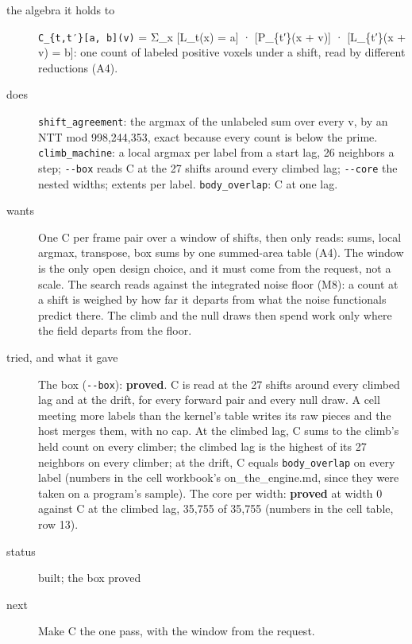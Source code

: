 \begin{description}
\item[{the algebra it holds to}] \texttt{C\_\allowbreak{}\{t,t′\}[a, b](v)} = Σ\_\allowbreak{}x [L\_\allowbreak{}t(x) = a] · [P\_\allowbreak{}\{t′\}(x + v)] · [L\_\allowbreak{}\{t′\}(x + v) = b]: one count of labeled positive voxels under a shift, read by different reductions (A4).
\item[{does}] \texttt{shift\_\allowbreak{}agreement}: the argmax of the unlabeled sum over every v, by an NTT mod 998,244,353, exact because every count is below the prime. \texttt{climb\_\allowbreak{}machine}: a local argmax per label from a start lag, 26 neighbors a step; \texttt{-\allowbreak{}-\allowbreak{}box} reads C at the 27 shifts around every climbed lag; \texttt{-\allowbreak{}-\allowbreak{}core} the nested widths; extents per label. \texttt{body\_\allowbreak{}overlap}: C at one lag.
\item[{wants}] One C per frame pair over a window of shifts, then only reads: sums, local argmax, transpose, box sums by one summed-area table (A4). The window is the only open design choice, and it must come from the request, not a scale. The search reads against the integrated noise floor (M8): a count at a shift is weighed by how far it departs from what the noise functionals predict there. The climb and the null draws then spend work only where the field departs from the floor.
\item[{tried, and what it gave}] The box (\texttt{-\allowbreak{}-\allowbreak{}box}): \textbf{proved}. C is read at the 27 shifts around every climbed lag and at the drift, for every forward pair and every null draw. A cell meeting more labels than the kernel's table writes its raw pieces and the host merges them, with no cap. At the climbed lag, C sums to the climb's held count on every climber; the climbed lag is the highest of its 27 neighbors on every climber; at the drift, C equals \texttt{body\_\allowbreak{}overlap} on every label (numbers in the cell workbook's on\_\allowbreak{}the\_\allowbreak{}engine.md, since they were taken on a program's sample). The core per width: \textbf{proved} at width 0 against C at the climbed lag, 35,755 of 35,755 (numbers in the cell table, row 13).
\item[{status}] built; the box proved
\item[{next}] Make C the one pass, with the window from the request.
\end{description}

